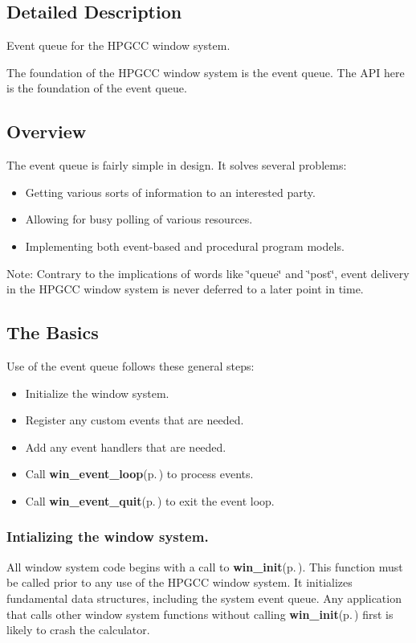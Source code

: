 \subsection{Detailed Description}
Event queue for the HPGCC window system. 

The foundation of the HPGCC window system is the event queue. The API here is the foundation of the event queue.\subsection{Overview}\label{winevent_8h_overview}
The event queue is fairly simple in design. It solves several problems:

\begin{itemize}
\item Getting various sorts of information to an interested party. \item Allowing for busy polling of various resources. \item Implementing both event-based and procedural program models.\end{itemize}
\begin{Desc}
\item[Note:]Contrary to the implications of words like \char`\"{}queue\char`\"{} and \char`\"{}post\char`\"{}, event delivery in the HPGCC window system is never deferred to a later point in time.\end{Desc}
\subsection{The Basics}\label{winevent_8h_basics}
Use of the event queue follows these general steps:

\begin{itemize}
\item Initialize the window system. \item Register any custom events that are needed. \item Add any event handlers that are needed. \item Call {\bf win\_\-event\_\-loop}{\rm (p.\,\pageref{winevent_8h_a7})} to process events. \item Call {\bf win\_\-event\_\-quit}{\rm (p.\,\pageref{winevent_8h_a8})} to exit the event loop.\end{itemize}
\subsubsection{Intializing the window system.}\label{winevent_8h_init}
All window system code begins with a call to {\bf win\_\-init}{\rm (p.\,\pageref{winevent_8h_a2})}. This function must be called prior to any use of the HPGCC window system. It initializes fundamental data structures, including the system event queue. Any application that calls other window system functions without calling {\bf win\_\-init}{\rm (p.\,\pageref{winevent_8h_a2})} first is likely to crash the calculator.



